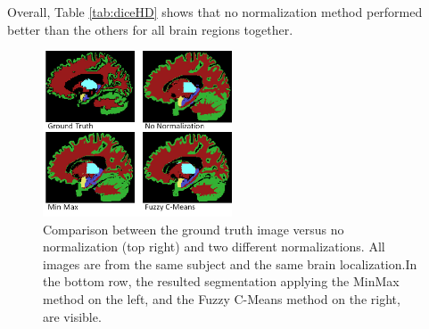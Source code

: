 \documentclass[article]{IEEEtran}
\begin{document}
	Overall, Table \ref{tab:diceHD} shows that no normalization method performed better than the others for all brain regions together. 
	\begin{figure}[h]
		\centering
		\includegraphics[width=0.5\textwidth]{compNorms.png}
		\caption{Comparison between the ground truth image versus no normalization (top right) and two different normalizations. All images are from the same subject and the same brain localization.In the bottom row, the resulted segmentation applying the MinMax method on the left, and the Fuzzy C-Means method on the right, are visible. }
		\label{fig:e2}
	\end{figure}
\end{document}
